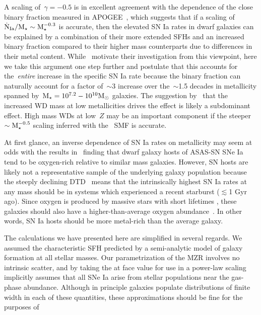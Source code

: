 \documentclass[ms.tex]{subfiles}
\begin{document}
A scaling of~$\gamma = -0.5$ is in excellent agreement with the dependence of
the close binary fraction measured in APOGEE~\citep{Moe2019}, which suggests
that if a scaling of~$\dot{\text{N}}_\text{Ia} / \text{M}_\star \sim \text{M}_\star^{-0.3}$ is
accurate, then the elevated SN Ia rates in dwarf galaxies can be explained by a
combination of their more extended SFHs and an increased binary fraction
compared to their higher mass counterparts due to differences in their metal
content.
While~\citet{Gandhi2022} motivate their investigation from this viewpoint, here
we take this argument one step further and postulate that this accounts for
the~\textit{entire} increase in the specific SN Ia rate because the binary
fraction can naturally account for a factor of~$\sim$3 increase over
the~$\sim$1.5 decades in metallicity spanned by~$\text{M}_\star = 10^{7.2} - 10^{10}
\text{M}_\odot$ galaxies.
The suggestion by~\citet{Kistler2013} that the increased WD mass at low
metallicities drives the effect is likely a subdominant effect.
High mass WDs at low~$Z$ may be an important component if the
steeper~$\sim \text{M}_\star^{-0.5}$ scaling inferred with the~\citet{Bell2003} SMF is
accurate.
\par
At first glance, an inverse dependence of SN Ia rates on metallicity may seem
at odds with the results in~\citet{Holoien2022} finding that dwarf galaxy
hosts of ASAS-SN SNe Ia tend to be oxygen-rich relative to similar mass
galaxies.
However, SN hosts are likely not a representative sample of the underlying
galaxy population because the steeply declining DTD~\citep[e.g.,][]{Maoz2012a}
means that the intrinsically highest SN Ia rates at any mass should be in
systems which experienced a recent starburst ($\lesssim$1 Gyr ago).
Since oxygen is produced by massive stars with short lifetimes
\citep*[e.g.,][]{Hurley2000, Johnson2019}, these galaxies should also have a
higher-than-average oxygen abundance~\citep[see, e.g.,][]{Johnson2020}.
In other words, SN Ia hosts should be more metal-rich than the average galaxy.
\par
The calculations we have presented here are simplified in several regards.
We assumed the characteristic SFH predicted by a semi-analytic model of
galaxy formation at all stellar masses.
Our parametrization of the MZR involves no intrinsic scatter, and by taking the
\citet{Zahid2014} at face value for use in a power-law scaling implicitly
assumes that all SNe Ia arise from stellar populations near the gas-phase
abundance.
Although in principle galaxies populate distributions of finite width in each
of these quantities, these approximations should be fine for the purposes of
\end{document}
